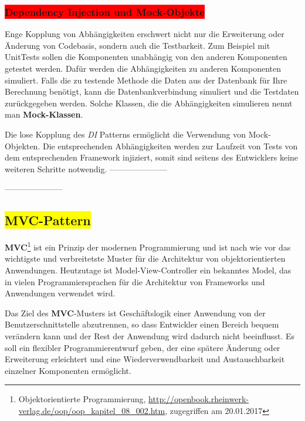 \subsubsection{\colorbox{red}{Dependency Injection und Mock-Objekte}}\label{di}

Enge Kopplung von Abhängigkeiten erschwert nicht nur die Erweiterung oder Änderung von Codebasis, sondern auch die Testbarkeit. Zum Beispiel mit UnitTests sollen die Komponenten unabhängig von den anderen Komponenten getestet werden. Dafür werden die Abhängigkeiten zu anderen Komponenten simuliert. Falls die zu testende Methode die Daten aus der Datenbank für Ihre Berechnung benötigt, kann die Datenbankverbindung simuliert und die Testdaten zurückgegeben werden. Solche Klassen, die die Abhängigkeiten simulieren nennt man \textbf{Mock-Klassen}.

Die lose Kopplung des \textit{DI} Patterns ermöglicht die Verwendung von Mock-Objekten. Die entsprechenden Abhängigkeiten werden zur Laufzeit von Tests von dem entsprechenden Framework injiziert, somit sind seitens des Entwicklers keine weiteren Schritte notwendig.
---------------------

---------------------
\subsection{\colorbox{yellow}{MVC-Pattern}}\label{mvc}

\textbf{MVC}\footnote{Objektorientierte Programmierung, \url{http://openbook.rheinwerk-verlag.de/oop/oop_kapitel_08_002.htm}, zugegriffen am 20.01.2017} ist ein Prinzip der modernen Programmierung und ist nach wie vor das wichtigste und verbreitetste Muster für die Architektur von objektorientierten Anwendungen. Heutzutage ist Model-View-Controller ein bekanntes Model, das in vielen Programmiersprachen für die Architektur von Frameworks und Anwendungen verwendet wird.

Das Ziel des \textbf{MVC}-Musters ist Geschäftslogik einer Anwendung von der Benutzerschnittstelle abzutrennen, so dass Entwickler einen Bereich bequem verändern kann und der Rest der Anwendung wird dadurch nicht beeinflusst.
Es soll ein flexibler Programmierentwurf geben, der eine spätere Änderung oder Erweiterung erleichtert und eine Wiederverwendbarkeit und Austauschbarkeit einzelner Komponenten ermöglicht.

